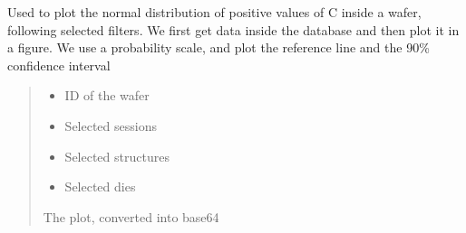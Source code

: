 \documentclass[letterpaper,10pt,english]{sphinxmanual}
\begin{document}

\begin{fulllineitems}
\label{\detokenize{normal_plots:normal_plots.C_normal_distrib_pos}}
\pysigstartsignatures
{}
\pysigstopsignatures
\sphinxAtStartPar
Used to plot the normal distribution of positive values of C inside a wafer, following selected filters.
We first get data inside the database and then plot it in a figure. We use a probability scale, and plot the reference line and the 90\% confidence interval
\begin{quote}\begin{description}
\begin{itemize}
\item {} 
\sphinxAtStartPar
{} \textendash{} ID of the wafer

\item {} 
\sphinxAtStartPar
{} \textendash{} Selected sessions

\item {} 
\sphinxAtStartPar
{} \textendash{} Selected structures

\item {} 
\sphinxAtStartPar
{} \textendash{} Selected dies

\end{itemize}

\sphinxAtStartPar
The plot, converted into base64

\end{description}\end{quote}

\end{fulllineitems}

\end{document}

